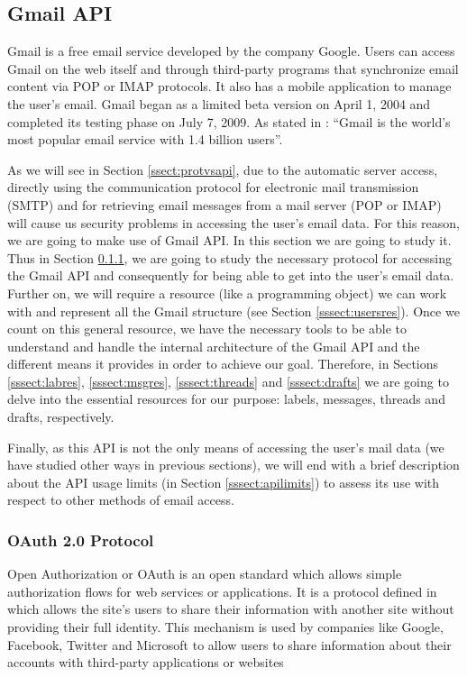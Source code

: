 \subsection{Gmail API}\label{ssect:gmailapi}
Gmail is a free email service developed by the company Google. Users can access Gmail on the web itself and through third-party programs that synchronize email content via POP or IMAP protocols. It also has a mobile application to manage the user's email. Gmail began as a limited beta version on April 1, 2004 and completed its testing phase on July 7, 2009. As stated in \cite{gmailbbc}: ``Gmail is the world's most popular email service with 1.4 billion users''.

As we will see in Section \ref{ssect:protvsapi}, due to the automatic server access, directly using the communication protocol for electronic mail transmission (SMTP) and for retrieving email messages from a mail server (POP or IMAP) will cause us security problems in accessing the user's email data. For this reason, we are going to make use of Gmail API. In this section we are going to study it. Thus in Section \ref{sssect:oauth}, we are going to study the necessary protocol for accessing the Gmail API and consequently for being able to get into the user's email data. Further on, we will require a resource (like a programming object) we can work with and represent all the Gmail structure (see Section \ref{sssect:usersres}). Once we count on this general resource, we have the necessary tools to be able to understand and handle the internal architecture of the Gmail API and the different means it provides in order to achieve our goal. Therefore, in Sections \ref{sssect:labres}, \ref{sssect:msgres}, \ref{sssect:threads} and \ref{sssect:drafts} we are going to delve into the essential resources for our purpose: labels, messages, threads and drafts, respectively.

Finally, as this API is not the only means of accessing the user's mail data (we have studied other ways in previous sections), we will end with a brief description about the API usage limits (in Section \ref{sssect:apilimits}) to assess its use with respect to other methods of email access.

\subsubsection{OAuth 2.0 Protocol}\label{sssect:oauth}
Open Authorization or OAuth \citep{oauth} is an open standard which allows simple authorization flows for web services or applications. It is a protocol defined in \cite{rfc6749} which allows the site's users to share their information with another site without providing their full identity. This mechanism is used by companies like Google, Facebook, Twitter and Microsoft to allow users to share information about their accounts with third-party applications or websites

